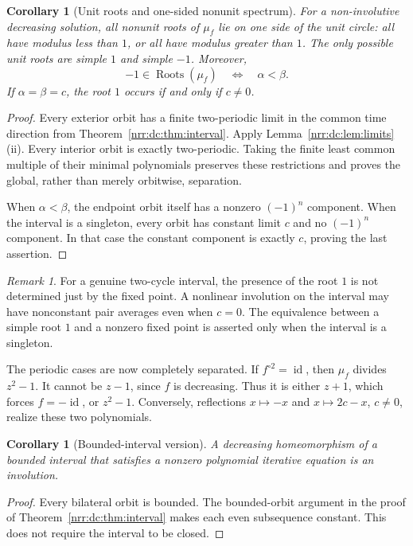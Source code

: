 \documentclass[11pt,letterpaper]{article}
\newtheorem{corollary}[theorem]{Corollary}
\theoremstyle{definition}
\theoremstyle{remark}
\newtheorem{remark}[theorem]{Remark}
\newcommand{\id}{\operatorname{id}}
\newcommand{\roots}{\operatorname{Roots}}
\begin{document}
\begin{corollary}[Unit roots and one-sided nonunit spectrum]
\label{nrr:dc:cor:separation}
For a non-involutive decreasing solution, all nonunit roots of $\mu_f$
lie on one side of the unit circle: all have modulus less than $1$,
or all have modulus greater than $1$. The only possible unit roots
are simple $1$ and simple $-1$. Moreover,
\begin{equation}
 -1\in\roots(\mu_f)\quad\Longleftrightarrow\quad\alpha<\beta.
 \label{nrr:dc:eq:minus-one}
\end{equation}
If $\alpha=\beta=c$, the root $1$ occurs if and only if $c\ne0$.
\end{corollary}
\begin{proof}
Every exterior orbit has a finite two-periodic limit in the common
time direction from Theorem~\ref{nrr:dc:thm:interval}. Apply
Lemma~\ref{nrr:dc:lem:limits}(ii). Every interior orbit is exactly
two-periodic. Taking the finite least common multiple of their minimal
polynomials preserves these restrictions and proves the global, rather than
merely orbitwise, separation.

When $\alpha<\beta$, the endpoint orbit itself has a nonzero
$(-1)^n$ component. When the interval is a singleton, every orbit
has constant limit $c$ and no $(-1)^n$ component. In that case the
constant component is exactly $c$, proving the last assertion.
\end{proof}

\begin{remark}
For a genuine two-cycle interval, the presence of the root $1$ is not
determined just by the fixed point. A nonlinear involution on the
interval may have nonconstant pair averages even when $c=0$.
The equivalence between a simple root $1$ and a nonzero fixed point
is asserted only when the interval is a singleton.
\end{remark}

The periodic cases are now completely separated. If $f^{\circ2}=\id$,
then $\mu_f$ divides $z^2-1$. It cannot be $z-1$, since $f$ is
decreasing. Thus it is either $z+1$, which forces $f=-\id$, or
$z^2-1$. Conversely, reflections $x\mapsto-x$ and $x\mapsto2c-x$,
$c\ne0$, realize these two polynomials.

\begin{corollary}[Bounded-interval version]
\label{nrr:dc:cor:bounded}
A decreasing homeomorphism of a bounded interval that satisfies a
nonzero polynomial iterative equation is an involution.
\end{corollary}
\begin{proof}
Every bilateral orbit is bounded. The bounded-orbit argument in the
proof of Theorem~\ref{nrr:dc:thm:interval} makes each even subsequence
constant. This does not require the interval to be closed.
\end{proof}
\end{document}
